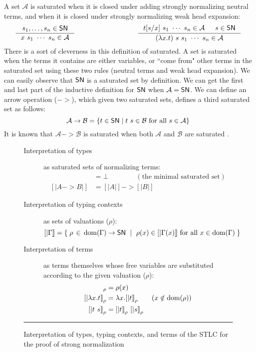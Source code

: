 A set $\mathcal{A}$ is saturated when it is closed under adding
strongly normalizing neutral terms, and when it is closed under strongly normalizing weak head expansion:
\[
\inference{s_1,\ldots,s_n\in\SN}{x~s_1~\cdots~s_n \in \mathcal{A}}
\qquad\qquad\qquad\qquad\quad
\inference{t[s/x]~s_1~\cdots~s_n\in \mathcal{A} & s\in\SN}
          {(\l x.t)~s~s_1~\cdots~s_n \in \mathcal{A}}
\]
There is a sort of cleverness in this definition of saturated.
A set is saturated when the terms it contains are either variables,
or ``come from" other terms in the saturated set using these two rules
(neutral terms and weak head expansion). We can easily observe that $\mathsf{SN}$ is
a saturated set by definition.  We can get the first and last part of
the inductive definition for $\mathsf{SN}$ when $\mathcal{A}=\mathsf{SN}$. We can define
an arrow operation ($->$), which given two saturated sets, defines
a third saturated set as follows:
\[ \mathcal{A} -> \mathcal{B} =
  \{ t \in \mathsf{SN} \mid t~s \in \mathcal{B} ~\text{for all}~ s \in \mathcal{A} \} \]
It is known that $\mathcal{A} -> \mathcal{B}$ is saturated
when both $\mathcal{A}$ and $\mathcal{B}$ are saturated \cite{Tait75}.

\begin{figure}
\begin{singlespace}
\begin{description}
\item[Interpretation of types] as saturated sets of normalizing terms:
\begin{align*}
[| \iota  |] &= \bot \qquad\qquad (\text{the minimal saturated set}) \\
[| A -> B |] &= [| A |] -> [| B |]
\end{align*}

\item[Interpretation of typing contexts] as sets of valuations ($\rho$):
\[ [| \Gamma |] =
        \{\; \rho\,\in\,\mathop{\mathrm{dom}}(\Gamma) -> \mathsf{SN} ~\mid~
             \rho(x) \in [|\Gamma(x)|] ~\text{for all}~x\in\mathop{\mathrm{dom}}(\Gamma) \;\}
\]

\item[Interpretation of terms] as terms themselves whose free variables are
        substituted according to the given valuation ($\rho$):
\begin{align*}
[|x|]_\rho      &= \rho(x) \\
[|\l x.t|]_\rho &= \l x.[|t|]_\rho  \qquad (x\notin\dom(\rho)) \\
[|t~s|]_\rho    &= [|t|]_\rho~[|s|]_\rho
\end{align*}
\end{description}
\caption[Interpretation of the STLC for proving strong normalization]
        {Interpretation of types, typing contexts, and terms of the STLC
         for the proof of strong normalization}
\label{fig:interpSTLC}
\end{singlespace}
\vspace*{.5em}\hrule
\end{figure}


